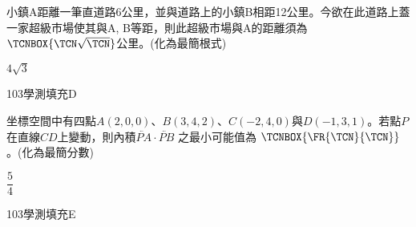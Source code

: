 \begin{QUESTIONS}
\begin{QUESTION}
\begin{QBODY}
			小鎮A距離一筆直道路6公里，並與道路上的小鎮B相距12公里。今欲在此道路上蓋一家超級市場使其與A, B等距，則此超級市場與A的距離須為$\TCNBOX{\TCN\sqrt{\TCN}}$公里。(化為最簡根式)
        \end{QBODY}
        \begin{QFROMS}
        \end{QFROMS}
        \begin{QTAGS}\end{QTAGS}
        \begin{QANS}
            $4\sqrt{3}$
        \end{QANS}
        \begin{QSOLLIST}
        \end{QSOLLIST}
        \begin{QEMPTYSPACE}
        \end{QEMPTYSPACE}
    \end{QUESTION}
    \begin{QUESTION}
        \begin{ExamInfo}{103}{學測}{填充}{D}
        \end{ExamInfo}
        \begin{ExamAnsRateInfo}{31}{76}{16}{1}
        \end{ExamAnsRateInfo}
        \begin{QBODY}
			坐標空間中有四點$A(2,0,0)$、$B(3,4,2)$、$C(-2,4,0)$與$D(-1,3,1)$。若點$P$在直線$CD$上變動，則內積$\lvec{PA}\cdot \lvec{PB}$ 之最小可能值為 $\TCNBOX{\FR{\TCN}{\TCN}}$。(化為最簡分數)
        \end{QBODY}
        \begin{QFROMS}
        \end{QFROMS}
        \begin{QTAGS}\end{QTAGS}
        \begin{QANS}
            $\dfrac{5}{4}$
        \end{QANS}
        \begin{QSOLLIST}
        \end{QSOLLIST}
        \begin{QEMPTYSPACE}
        \end{QEMPTYSPACE}
    \end{QUESTION}
    \begin{QUESTION}
        \begin{ExamInfo}{103}{學測}{填充}{E}
        \end{ExamInfo}
        \begin{ExamAnsRateInfo}{31}{75}{17}{1}

\end{ExamAnsRateInfo}
\end{QUESTION}
\end{QUESTIONS}
